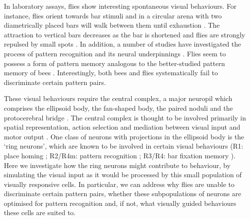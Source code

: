 In laboratory assays, flies show interesting spontaneous visual behaviours. For instance, flies orient towards bar stimuli \cite{Reichardt1969,Gotz1987} and in a circular arena with two diametrically placed bars will walk between them until exhaustion \cite{Strauss1993}. The attraction to vertical bars decreases as the bar is shortened and flies are strongly repulsed by small spots \cite{Maimon2008}. In addition, a number of studies have investigated the process of pattern recognition and its neural underpinnings \cite{Ernst1999,Liu2006,Pan2009}. Flies seem to possess a form of pattern memory analogous to the better-studied pattern memory of bees \cite{vonFrisch1914,Giurfa1997,Horridge2009}. Interestingly, both bees \cite{Srinivasan1994} and flies \cite{Ernst1999} systematically fail to discriminate certain pattern pairs. 

These visual behaviours require the central complex, a major neuropil which comprises the ellipsoid body, the fan-shaped body, the paired noduli and the protocerebral bridge \cite{Young2010}. The central complex is thought to be involved primarily in spatial representation, action selection and mediation between visual input and motor output \cite{Pfeiffer2014}. One class of neurons with projections in the ellipsoid body is the `ring neurons', which are known to be involved in certain visual behaviours (R1: place homing \cite{Sitaraman2008,Sitaraman2010,Ofstad2011}; R2/R4m: pattern recognition \cite{Ernst1999,Liu2006,Pan2009}; R3/R4: bar fixation memory \cite{Neuser2008}). Here we investigate how the ring neurons might contribute to behaviour, by simulating the visual input as it would be processed by this small population of visually responsive cells. In particular, we can address why flies are unable to discriminate certain pattern pairs, whether these subpopulations of neurons are optimised for pattern recognition and, if not, what visually guided behaviours these cells are suited to.

